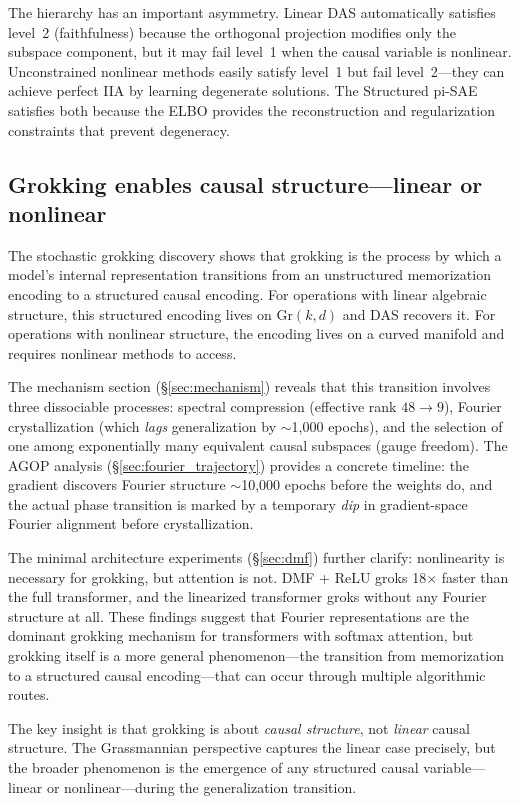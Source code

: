 \documentclass{article}
\newcommand{\Gr}{\mathrm{Gr}}
\begin{document}
The hierarchy has an important asymmetry. Linear DAS automatically satisfies
level~2 (faithfulness) because the orthogonal projection modifies only the
subspace component, but it may fail level~1 when the causal variable is
nonlinear. Unconstrained nonlinear methods easily satisfy level~1 but fail
level~2---they can achieve perfect IIA by learning degenerate solutions. The
Structured pi-SAE satisfies both because the ELBO provides the reconstruction and
regularization constraints that prevent degeneracy.

\subsection{Grokking enables causal structure---linear or nonlinear}

The stochastic grokking discovery shows that grokking is the process by which a
model's internal representation transitions from an unstructured memorization
encoding to a structured causal encoding. For operations with linear algebraic
structure, this structured encoding lives on $\Gr(k,d)$ and DAS recovers it.
For operations with nonlinear structure, the encoding lives on a curved manifold
and requires nonlinear methods to access.

The mechanism section (\S\ref{sec:mechanism}) reveals that this transition
involves three dissociable processes: spectral compression (effective rank
$48 \to 9$), Fourier crystallization (which \emph{lags} generalization by
$\sim$1{,}000 epochs), and the selection of one among exponentially many
equivalent causal subspaces (gauge freedom). The AGOP analysis
(\S\ref{sec:fourier_trajectory}) provides a concrete timeline: the gradient
discovers Fourier structure $\sim$10{,}000 epochs before the weights do,
and the actual phase transition is marked by a temporary \emph{dip} in
gradient-space Fourier alignment before crystallization.

The minimal architecture experiments (\S\ref{sec:dmf}) further clarify:
nonlinearity is necessary for grokking, but attention is not. DMF + ReLU
groks 18$\times$ faster than the full transformer, and the linearized
transformer groks without any Fourier structure at all. These findings
suggest that Fourier representations are the dominant grokking mechanism
for transformers with softmax attention, but grokking itself is a more
general phenomenon---the transition from memorization to a structured
causal encoding---that can occur through multiple algorithmic routes.

The key insight is that grokking is about \emph{causal structure}, not
\emph{linear} causal structure. The Grassmannian perspective captures the linear
case precisely, but the broader phenomenon is the emergence of any structured
causal variable---linear or nonlinear---during the generalization transition.
\end{document}
